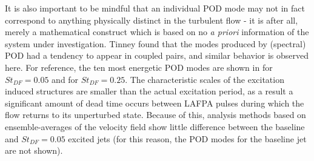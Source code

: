 It is also important to be mindful that an individual POD mode may not in fact correspond to anything physically distinct in the turbulent flow - it is after all, merely a mathematical construct which is based on no \textit{a priori} information of the system under investigation.
Tinney \etal [Tinney2008b] found that the modes produced by (spectral) POD had a tendency to appear in coupled pairs, and similar behavior is observed here. 
For reference, the ten most energetic POD modes are shown in  for $St_{DF} = 0.05$ and  for $St_{DF} = 0.25$.
The characteristic scales of the excitation induced structures are smaller than the actual excitation period, as a result a significant amount of dead time occurs between LAFPA pulses during which the flow returns to its unperturbed state.
Because of this, analysis methods based on ensemble-averages of the velocity field show little difference between the baseline and $St_{DF} = 0.05$ excited jets (for this reason, the POD modes for the baseline jet are not shown).


